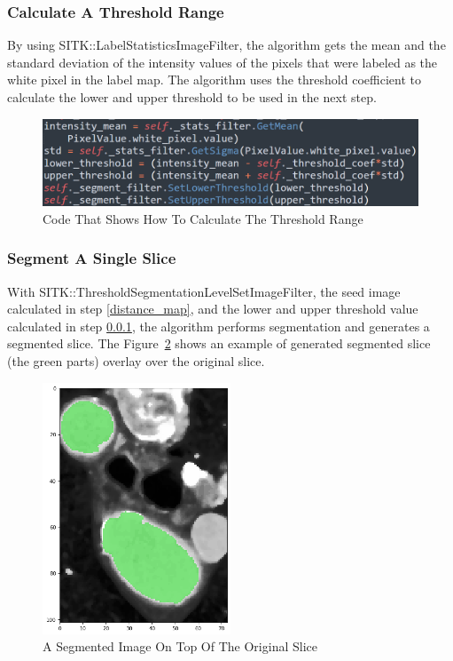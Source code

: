 \subsubsection{Calculate A Threshold Range} \label{threshold}
By using SITK::LabelStatisticsImageFilter, the algorithm gets the mean and the standard deviation of the intensity values of the pixels that were labeled as the white pixel in the label map. The algorithm uses the threshold coefficient to calculate the lower and upper threshold to be used in the next step.

\begin{figure}[H]
    \centering
    \includegraphics[width=\textwidth]{figures/AGR/threshold.png}
    \caption[Code That Shows How To Calculate The Threshold Range]{Code That Shows How To Calculate The Threshold Range}
    \label{fig_threshold}
\end{figure}

\subsubsection{Segment A Single Slice}
With SITK::ThresholdSegmentationLevelSetImageFilter, the seed image calculated in step \ref{distance_map}, and the lower and upper threshold value calculated in step \ref{threshold}, the algorithm performs segmentation and generates a segmented slice. The Figure~\ref{fig_segmented_image} shows an example of generated segmented slice (the green parts) overlay over the original slice.

\begin{figure}[H]
    \centering
    \includegraphics[width=0.5\textwidth]{figures/AGR/segment_label_image.png}
    \caption[A Segmented Image]{A Segmented Image On Top Of The Original Slice}
    \label{fig_segmented_image}
\end{figure}

